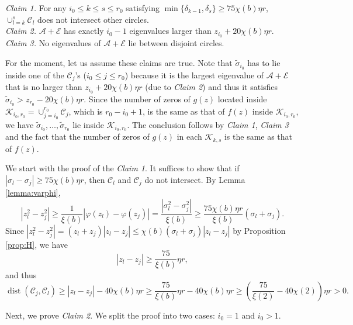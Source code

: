 \documentclass[reqno]{amsart}
\DeclareMathOperator{\dist}{dist}
\theoremstyle{plain}
\theoremstyle{definition}
\begin{document}
\noindent\emph{Claim 1.} For any $i_0 \le k\le s \le r_0$ satisfying $\min\{\delta_{k-1},\delta_s \} \ge 75 \chi(b) \eta r$, $\cup_{l=k}^s \mathcal C_l$ does not intersect other circles.\\
\noindent\emph{Claim 2.}  $\mathcal A+\mathcal E$ has exactly $i_0-1$ eigenvalues larger than $z_{i_0}+20\chi(b)\eta r$.\\
\noindent\emph{Claim 3.} No eigenvalues of $\mathcal A+\mathcal E$ lie between disjoint circles. 

For the moment, let us assume these claims are true. Note that $\widetilde \sigma_{i_0}$ has to lie inside one of the $\mathcal C_j$'s ($i_0 \le j \le r_0$) because it is the largest eigenvalue of $\mathcal A+\mathcal E$ that is no larger than $z_{i_0}+20\chi(b)\eta r$ (due to \emph{Claim 2}) and thus it satisfies $\widetilde \sigma_{i_0} > z_{r_0} - 20\chi(b)\eta r$. Since the number of zeros of $g(z)$ located inside $\mathcal K_{i_0,r_0}=\cup_{j=i_0}^{r_0}\mathcal C_j$, which is $r_0-i_0+1$, is the same as that of $f(z)$ inside $\mathcal K_{i_0,r_0}$, we have $\widetilde \sigma_{i_0},\ldots,\widetilde \sigma_{r_0}$ lie inside $\mathcal K_{i_0,r_0}$. The conclusion follows by \emph{Claim 1}, \emph{Claim 3} and the fact that the number of zeros of $g(z)$ in each $\mathcal K_{k,s}$ is the same as that of $f(z)$. 


We start with the proof of the \emph{Claim 1}. It suffices to show that if $|\sigma_l -\sigma_j| \ge 75 \chi(b) \eta r$, then $\mathcal C_l$ and $\mathcal C_j$ do not intersect. By Lemma \ref{lemma:varphi},
$$|z_l^2 - z_j^2| \ge \frac{1}{\xi(b)}|\varphi(z_l) - \varphi(z_j)| =\frac{|\sigma_l^2 - \sigma_j^2|}{\xi(b)}  \ge \frac{75 \chi(b) \eta r}{\xi(b)}(\sigma_l + \sigma_j).$$
Since $|z_l^2 - z_j^2| = (z_l+z_j) |z_l-z_j| \le \chi(b)(\sigma_l + \sigma_j) |z_l-z_j|$ by Proposition \ref{prop:H}, we have
\begin{equation}\label{eq:zljdiff}
|z_l - z_j |\ge \frac{75}{\xi(b)}\eta r, 
\end{equation}
and thus
$$\dist(\mathcal C_j, \mathcal C_l) \ge |z_l - z_j| - 40\chi(b)  \eta r \ge \frac{75}{\xi(b)}\eta r-40\chi(b)\eta r\ge \left(\frac{75}{\xi(2)}-40\chi(2)\right)\eta r>0. $$

\medskip

Next, we prove \emph{Claim 2}. We split the proof into two cases: $i_0=1$ and $i_0>1$.
\end{document}
